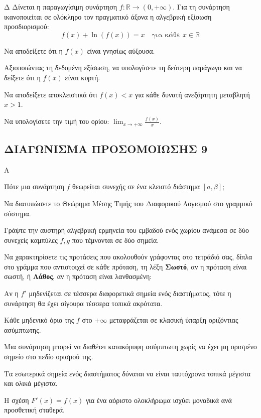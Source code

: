 \begin{thema}{Δ}
Δίνεται η παραγωγίσιμη συνάρτηση $f: \mathbb{R} \to (0, +\infty)$. Για τη συνάρτηση ικανοποιείται σε ολόκληρο τον πραγματικό άξονα η αλγεβρική εξίσωση προσδιορισμού:
\[ f(x) + \ln(f(x)) = x \quad \text{για κάθε } x \in \mathbb{R} \]
\begin{erwthma}
    \item Να αποδείξετε ότι η $f(x)$ είναι γνησίως αύξουσα. 
    \item Αξιοποιώντας τη δεδομένη εξίσωση, να υπολογίσετε τη δεύτερη παράγωγο και να δείξετε ότι η $f(x)$ είναι κυρτή. 
    \item Να αποδείξετε αποκλειστικά ότι $f(x) < x$ για κάθε δυνατή ανεξάρτητη μεταβλητή $x > 1$. 
    \item Να υπολογίσετε την τιμή του ορίου: $\displaystyle\lim_{x\to+\infty} \frac{f(x)}{x}$. 
\end{erwthma}
\end{thema}

\newpage
\subsection{ΔΙΑΓΩΝΙΣΜΑ ΠΡΟΣΟΜΟΙΩΣΗΣ 9}

\begin{thema}{Α}
\begin{erwthma}
    \item Πότε μια συνάρτηση $f$ θεωρείται συνεχής σε ένα κλειστό διάστημα $[a, \beta]$; 
    \item Να διατυπώσετε το Θεώρημα Μέσης Τιμής του Διαφορικού Λογισμού στο γραμμικό σύστημα. 
    \item Γράψτε την αυστηρή αλγεβρική ερμηνεία του εμβαδού ενός χωρίου ανάμεσα σε δύο συνεχείς καμπύλες $f,g$ που τέμνονται σε δύο σημεία. 
    \item Να χαρακτηρίσετε τις προτάσεις που ακολουθούν γράφοντας στο τετράδιό σας, δίπλα στο γράμμα που αντιστοιχεί σε κάθε πρόταση, τη λέξη \textbf{Σωστό},
αν η πρόταση είναι σωστή, ή \textbf{Λάθος}, αν η πρόταση είναι λανθασμένη:
    \begin{alist}
        \item Αν η $f'$ μηδενίζεται σε τέσσερα διαφορετικά σημεία ενός διαστήματος, τότε η συνάρτηση θα έχει σίγουρα τέσσερα τοπικά ακρότατα.
        \item Κάθε μηδενικό όριο της $f$ στο $+\infty$ μεταφράζεται σε κλασική ύπαρξη οριζόντιας ασύμπτωτης.
        \item Μια συνάρτηση μπορεί να διαθέτει κατακόρυφη ασύμπτωτη χωρίς να έχει μη ορισμένο σημείο στο πεδίο ορισμού της.
        \item Τα εσωτερικά σημεία ενός διαστήματος δύναται να είναι ταυτόχρονα τοπικά μέγιστα και ολικά μέγιστα.
        \item Η σχέση $F'(x) = f(x)$ για ένα αόριστο ολοκλήρωμα ισχύει μοναδικά ανά προσθετική σταθερά.
    \end{alist} 
\end{erwthma}
\end{thema}

